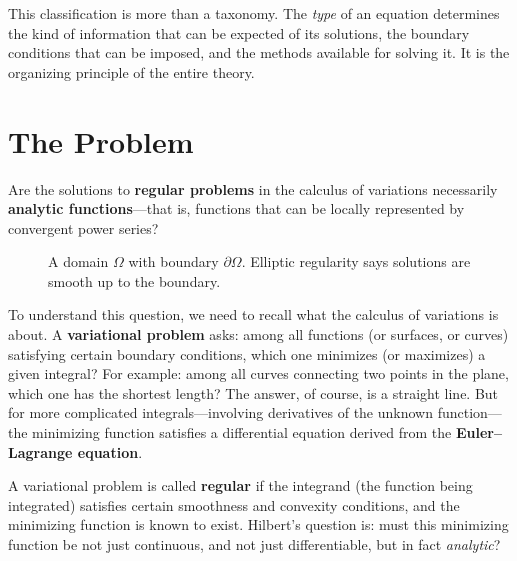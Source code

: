 This classification is more than a taxonomy. The \emph{type} of an equation determines the kind of information that can be expected of its solutions, the boundary conditions that can be imposed, and the methods available for solving it. It is the organizing principle of the entire theory.

\section{The Problem}

\begin{problem_statement}
Are the solutions to \textbf{regular problems} in the calculus of variations necessarily \textbf{analytic functions}---that is, functions that can be locally represented by convergent power series?
\end{problem_statement}

\begin{figure}[htbp]
\centering
{}
\caption{A domain $\Omega$ with boundary $\partial\Omega$. Elliptic regularity says solutions are smooth up to the boundary.}
\label{fig:domain-boundary}
\end{figure}

To understand this question, we need to recall what the calculus of variations is about. A \textbf{variational problem} asks: among all functions (or surfaces, or curves) satisfying certain boundary conditions, which one minimizes (or maximizes) a given integral? For example: among all curves connecting two points in the plane, which one has the shortest length? The answer, of course, is a straight line. But for more complicated integrals---involving derivatives of the unknown function---the minimizing function satisfies a differential equation derived from the \textbf{Euler--Lagrange equation}.

A variational problem is called \textbf{regular} if the integrand (the function being integrated) satisfies certain smoothness and convexity conditions, and the minimizing function is known to exist. Hilbert's question is: must this minimizing function be not just continuous, and not just differentiable, but in fact \emph{analytic}?

